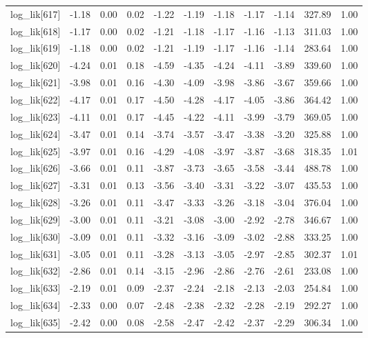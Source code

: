 \begin{table}[ht]
\begin{tabular}{rrrrrrrrrrr}
  log\_lik[617] & -1.18 & 0.00 & 0.02 & -1.22 & -1.19 & -1.18 & -1.17 & -1.14 & 327.89 & 1.00 \\ 
  log\_lik[618] & -1.17 & 0.00 & 0.02 & -1.21 & -1.18 & -1.17 & -1.16 & -1.13 & 311.03 & 1.00 \\ 
  log\_lik[619] & -1.18 & 0.00 & 0.02 & -1.21 & -1.19 & -1.17 & -1.16 & -1.14 & 283.64 & 1.00 \\ 
  log\_lik[620] & -4.24 & 0.01 & 0.18 & -4.59 & -4.35 & -4.24 & -4.11 & -3.89 & 339.60 & 1.00 \\ 
  log\_lik[621] & -3.98 & 0.01 & 0.16 & -4.30 & -4.09 & -3.98 & -3.86 & -3.67 & 359.66 & 1.00 \\ 
  log\_lik[622] & -4.17 & 0.01 & 0.17 & -4.50 & -4.28 & -4.17 & -4.05 & -3.86 & 364.42 & 1.00 \\ 
  log\_lik[623] & -4.11 & 0.01 & 0.17 & -4.45 & -4.22 & -4.11 & -3.99 & -3.79 & 369.05 & 1.00 \\ 
  log\_lik[624] & -3.47 & 0.01 & 0.14 & -3.74 & -3.57 & -3.47 & -3.38 & -3.20 & 325.88 & 1.00 \\ 
  log\_lik[625] & -3.97 & 0.01 & 0.16 & -4.29 & -4.08 & -3.97 & -3.87 & -3.68 & 318.35 & 1.01 \\ 
  log\_lik[626] & -3.66 & 0.01 & 0.11 & -3.87 & -3.73 & -3.65 & -3.58 & -3.44 & 488.78 & 1.00 \\ 
  log\_lik[627] & -3.31 & 0.01 & 0.13 & -3.56 & -3.40 & -3.31 & -3.22 & -3.07 & 435.53 & 1.00 \\ 
  log\_lik[628] & -3.26 & 0.01 & 0.11 & -3.47 & -3.33 & -3.26 & -3.18 & -3.04 & 376.04 & 1.00 \\ 
  log\_lik[629] & -3.00 & 0.01 & 0.11 & -3.21 & -3.08 & -3.00 & -2.92 & -2.78 & 346.67 & 1.00 \\ 
  log\_lik[630] & -3.09 & 0.01 & 0.11 & -3.32 & -3.16 & -3.09 & -3.02 & -2.88 & 333.25 & 1.00 \\ 
  log\_lik[631] & -3.05 & 0.01 & 0.11 & -3.28 & -3.13 & -3.05 & -2.97 & -2.85 & 302.37 & 1.01 \\ 
  log\_lik[632] & -2.86 & 0.01 & 0.14 & -3.15 & -2.96 & -2.86 & -2.76 & -2.61 & 233.08 & 1.00 \\ 
  log\_lik[633] & -2.19 & 0.01 & 0.09 & -2.37 & -2.24 & -2.18 & -2.13 & -2.03 & 254.84 & 1.00 \\ 
  log\_lik[634] & -2.33 & 0.00 & 0.07 & -2.48 & -2.38 & -2.32 & -2.28 & -2.19 & 292.27 & 1.00 \\ 
  log\_lik[635] & -2.42 & 0.00 & 0.08 & -2.58 & -2.47 & -2.42 & -2.37 & -2.29 & 306.34 & 1.00 \\ 

\end{tabular}
\end{table}

